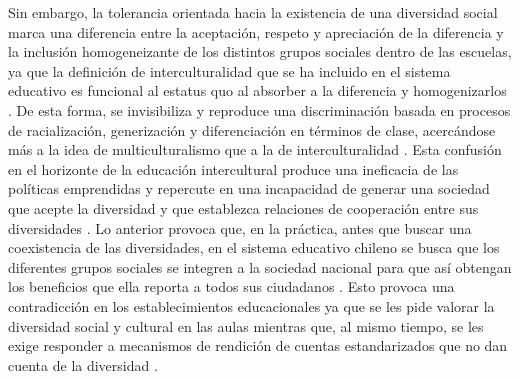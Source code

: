 \documentclass[12pt,twoside]{templates/facsothesis}
\begin{document}
Sin embargo, la tolerancia orientada hacia la existencia de una diversidad social marca una diferencia entre la aceptación, respeto y apreciación de la diferencia y la inclusión homogeneizante de los distintos grupos sociales dentro de las escuelas, ya que la definición de interculturalidad que se ha incluido en el sistema educativo es funcional al estatus quo al absorber a la diferencia y homogenizarlos \citep{riedemann_Desde_2020}. De esta forma, se invisibiliza y reproduce una discriminación basada en procesos de racialización, generización y diferenciación en términos de clase, acercándose más a la idea de multiculturalismo que a la de interculturalidad \citep{stefoni_Educacion_2016a}. Esta confusión en el horizonte de la educación intercultural produce una ineficacia de las políticas emprendidas y repercute en una incapacidad de generar una sociedad que acepte la diversidad y que establezca relaciones de cooperación entre sus diversidades \citep{donosoromo_INTERCULTURALIDAD_2006}. Lo anterior provoca que, en la práctica, antes que buscar una coexistencia de las diversidades, en el sistema educativo chileno se busca que los diferentes grupos sociales se integren a la sociedad nacional para que así obtengan los beneficios que ella reporta a todos sus ciudadanos \citep{donosoromo_INTERCULTURALIDAD_2006}. Esto provoca una contradicción en los establecimientos educacionales ya que se les pide valorar la diversidad social y cultural en las aulas mientras que, al mismo tiempo, se les exige responder a mecanismos de rendición de cuentas estandarizados que no dan cuenta de la diversidad \citep{riedemann_Desde_2020}.
\end{document}
